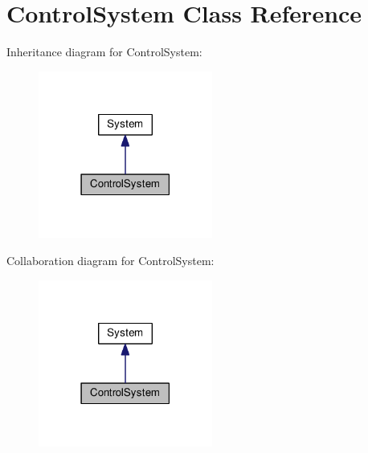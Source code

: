 \hypertarget{classControlSystem}{\section{Control\-System Class Reference}
\label{classControlSystem}
}


Inheritance diagram for Control\-System\-:
\nopagebreak
\begin{figure}[H]
\begin{center}
\leavevmode
\includegraphics[width=162pt]{classControlSystem__inherit__graph}
\end{center}
\end{figure}


Collaboration diagram for Control\-System\-:
\nopagebreak
\begin{figure}[H]
\begin{center}
\leavevmode
\includegraphics[width=162pt]{classControlSystem__coll__graph}
\end{center}
\end{figure}
